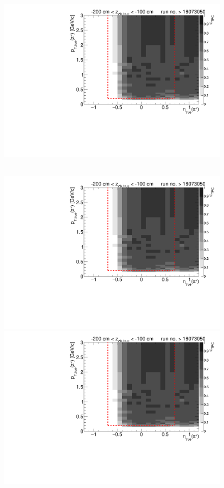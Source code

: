 \begin{figure}[hb]
{		\includegraphics[width=\linewidth,page=17]{graphics/eff/Eff2D_TPC_pion_Plus_RunRange2.pdf}
	}~
	\parbox{0.495\textwidth}{
		\centering
		\includegraphics[width=\linewidth,page=12]{graphics/eff/Eff2D_TPC_pion_Plus_RunRange2.pdf}\\
		\includegraphics[width=\linewidth,page=14]{graphics/eff/Eff2D_TPC_pion_Plus_RunRange2.pdf}\\
}
\end{figure}

